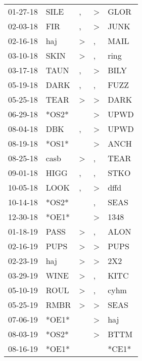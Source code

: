 \begin{supertabular}{lllll}
 01-27-18 &   SILE &                , &     \textgreater &   GLOR \\
 02-03-18 &    FIR &                , &     \textgreater &   JUNK \\
 02-16-18 &    haj &     \textgreater &                , &   MAIL \\
 03-10-18 &   SKIN &     \textgreater &                , &   ring \\
 03-17-18 &   TAUN &                , &     \textgreater &   BILY \\
 05-19-18 &   DARK &                , &                , &   FUZZ \\
 05-25-18 &   TEAR &     \textgreater &     \textgreater &   DARK \\
 06-29-18 &  *OS2* &                  &     \textgreater &   UPWD \\
 08-04-18 &    DBK &                , &     \textgreater &   UPWD \\
 08-19-18 &  *OS1* &                  &     \textgreater &   ANCH \\
 08-25-18 &   casb &     \textgreater &                , &   TEAR \\
 09-01-18 &   HIGG &                , &                , &   STKO \\
 10-05-18 &   LOOK &                , &     \textgreater &   dffd \\
 10-14-18 &  *OS2* &                  &                , &   SEAS \\
 12-30-18 &  *OE1* &                  &     \textgreater &   1348 \\
 01-18-19 &   PASS &     \textgreater &                , &   ALON \\
 02-16-19 &   PUPS &     \textgreater &     \textgreater &   PUPS \\
 02-23-19 &    haj &     \textgreater &     \textgreater &    2X2 \\
 03-29-19 &   WINE &     \textgreater &                , &   KITC \\
 05-10-19 &   ROUL &     \textgreater &                , &   cyhm \\
 05-25-19 &   RMBR &     \textgreater &     \textgreater &   SEAS \\
 07-06-19 &  *OE1* &                  &     \textgreater &    haj \\
 08-03-19 &  *OS2* &                  &     \textgreater &   BTTM \\
 08-16-19 &  *OE1* &                  &                  &  *CE1* \\

\end{supertabular}
